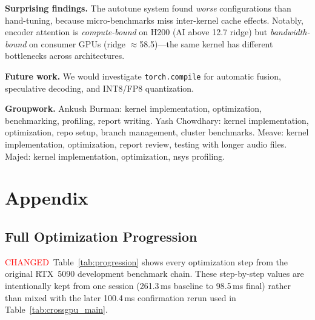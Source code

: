 \documentclass{article}
\newcommand{\chg}[1]{{\color{blue}#1}}
\newcommand{\chglabel}{{\setlength{\fboxsep}{1pt}\colorbox{yellow!45}{\textcolor{red}{\scriptsize CHANGED}}}}
\begin{document}
\textbf{Surprising findings.}
The autotune system found \emph{worse} configurations than hand-tuning, because micro-benchmarks miss inter-kernel cache effects.  Notably, encoder attention is \emph{compute-bound} on H200 (AI above 12.7 ridge) but \emph{bandwidth-bound} on consumer GPUs (ridge $\approx$58.5)---the same kernel has different bottlenecks across architectures.

\textbf{Future work.}
We would investigate \texttt{torch.compile} for automatic fusion, speculative decoding, and INT8/FP8 quantization.

\textbf{Groupwork.} Ankush Burman: kernel implementation, optimization, benchmarking, profiling, report writing. Yash Chowdhary: kernel implementation, optimization, repo setup, branch management, cluster benchmarks. Meave: kernel implementation, optimization, report review, testing with longer audio files. Majed: kernel implementation, optimization, nsys profiling.

\clearpage



\appendix
\section{Appendix}

\subsection{Full Optimization Progression}

\chglabel\ \chg{Table~\ref{tab:progression} shows every optimization step from the original RTX~5090 development benchmark chain.  These step-by-step values are intentionally kept from one session (261.3\,ms baseline to 98.5\,ms final) rather than mixed with the later 100.4\,ms confirmation rerun used in Table~\ref{tab:crossgpu_main}.}
\end{document}
